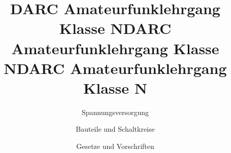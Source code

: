 \documentclass[aspectratio = 169]{beamer}
\begin{document}
\title{DARC Amateurfunklehrgang Klasse N}
\author{Spannungsversorgung}
\begin{frame}
\maketitle
\end{frame}






\title{DARC Amateurfunklehrgang Klasse N}
\author{Bauteile und Schaltkreise}
\begin{frame}
\maketitle
\end{frame}











\title{DARC Amateurfunklehrgang Klasse N}
\author{Gesetze und Vorschriften}
\begin{frame}
\maketitle
\end{frame}









\end{document}
